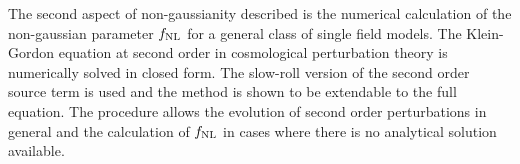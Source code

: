 The second aspect of non-gaussianity described is the numerical calculation
of the non-gaussian parameter $f_{\mathrm{NL}}$ for a general class of single field models.
The Klein-Gordon equation at second
order in cosmological perturbation theory is numerically solved in closed form. 
The slow-roll
version of the second order source term is used and the method is
shown to be extendable to the full equation.
The procedure allows the evolution of second order
perturbations in general and the calculation of $f_{\mathrm{NL}}$ in cases
where there is no analytical solution available. 
